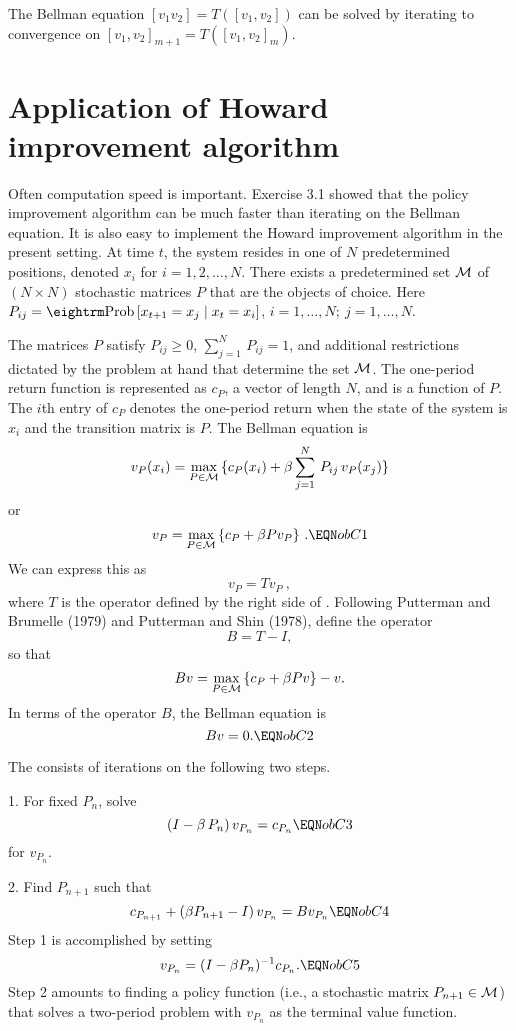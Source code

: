     The Bellman equation $ [v_1 v_2] = T([v_1, v_2])$
  can be solved by iterating to convergence on
$ [v_1, v_2]_{m+1} = T([v_1, v_2]_m).$


\section{Application of Howard improvement algorithm}

Often computation speed is important.  Exercise 3.1 showed
that the policy improvement algorithm can
be much faster than iterating on the Bellman equation.
It is also easy to implement the Howard improvement algorithm
in the present setting.
At time $t$, the system resides in one of $N$ predetermined positions,
denoted $x_i$ for $i=1,2,\ldots, N$.  There exists a predetermined set
$\cal M$ of $(N\times N)$ stochastic matrices $P$ that are the objects of
choice.  Here $P_{ij}={\rm Prob}\,[x_{t+1} = x_j\mid x_t=x_i]$, $i=1,\ldots,
N;\ j=1,\ldots, N$.

The matrices $P$ satisfy $P_{ij}\geq 0$, $\sum^N_{j=1}\, P_{ij} = 1$, and
additional restrictions dictated by the problem at hand that determine the
set $\cal M$.  The one-period return function is represented as $c_P$, a
vector of length $N$, and is a function of $P$.  The $i$th entry of $c_P$
denotes the one-period return when the state of the system is $x_i$ and the
transition matrix is $P$.  The Bellman equation is
$$v_P (x_i)=\max_{P\in{\cal M}}\, \{c_P(x_i) + \beta \sum^N_{j=1}\, P_{ij}\,
v_P(x_j)\}$$
or
$$v_P=\max_{P\in{\cal M}}\, \{c_P + \beta Pv_P\}\ .\EQN obC1$$
We can express this as
$$v_P = T v_P\ ,$$
where $T$ is the operator defined by the right side of .  Following
Putterman and Brumelle (1979) and Putterman and Shin (1978), define the
operator
    
%
$$B=T-I,$$
so that
$$B v = \max_{P\in{\cal M}}\, \{c_P + \beta P v\}-v .$$
In terms of the operator $B$, the Bellman equation is
$$Bv=0 . \EQN obC2$$

The  consists of iterations on the
following two steps.
\medskip
\item{1.}  For fixed $P_n$, solve
$$(I-\beta\, P_n)\, v_{P_n}= c_{P_n}\EQN obC3$$
for $v_{P_n}$.
\medskip
\item{2.}  Find $P_{n+1}$ such that
$$c_{P_{n+1}} + (\beta P_{n+1} - I)\, v_{P_n} = Bv_{P_n}\EQN obC4$$
\medskip
\noindent Step 1 is accomplished by setting
$$v_{P_n} = (I-\beta P_n)^{-1} c_{P_n} .\EQN obC5$$
\medskip\noindent
Step 2 amounts to finding a policy function
 (i.e., a stochastic matrix $P_{n+1}
\in {\cal M}$) that solves a two-period problem with $v_{P_n}$ as the terminal
value function.

